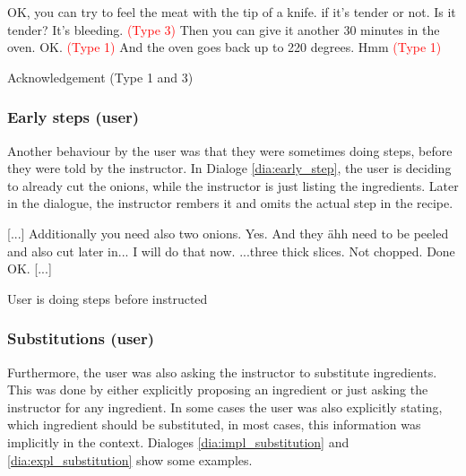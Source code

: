 \documentclass[
	11pt, %
]{fphw}
\newenvironment{captionedDialogue}
    {\captionsetup{
        type=Dialogue,
        skip=2pt,
        belowskip=15pt
        }
    }
    {}
\newenvironment{mydialogue}
    {\begin{snugshade}
     \hrulefill
     \begin{dialogue}}
    {\end{dialogue}
     \hrulefill
     \end{snugshade}}
\begin{document}
\begin{captionedDialogue}
    \begin{mydialogue}
         OK, you can try to feel the meat with the tip of a knife. if it's tender or not. Is it tender?
         It's bleeding. \textcolor{red}{(Type 3)}
         Then you can give it another 30 minutes in the oven. 
         OK. \textcolor{red}{(Type 1)}
         And the oven goes back up to 220 degrees. 
         Hmm \textcolor{red}{(Type 1)}
    \end{mydialogue}
    \caption{Acknowledgement (Type 1 and 3)}
    \label{dia:ack2}
\end{captionedDialogue}

\subsubsection*{Early steps (user)}
Another behaviour by the user was that they were sometimes doing steps, before they were told by the instructor. In Dialoge \ref{dia:early_step}, the user is deciding to already cut the onions, while the instructor is just listing the ingredients. Later in the dialogue, the instructor rembers it and omits the actual step in the recipe.

\begin{captionedDialogue}
    \begin{mydialogue}
         [...] Additionally you need also two onions. 
         Yes.
         And they ähh need to be peeled and also cut later in...
         I will do that now.
         ...three thick slices. Not chopped.
         Done
         OK. [...]
    \end{mydialogue}
    \caption{User is doing steps before instructed}
    \label{dia:early_step}
\end{captionedDialogue}

\subsubsection*{Substitutions (user)}
Furthermore, the user was also asking the instructor to substitute ingredients. This was done by either explicitly proposing an ingredient or just asking the instructor for any ingredient. In some cases the user was also explicitly stating, which ingredient should be substituted, in most cases, this information was implicitly in the context. Dialoges \ref{dia:impl_substitution} and \ref{dia:expl_substitution} show some examples.
\end{document}
